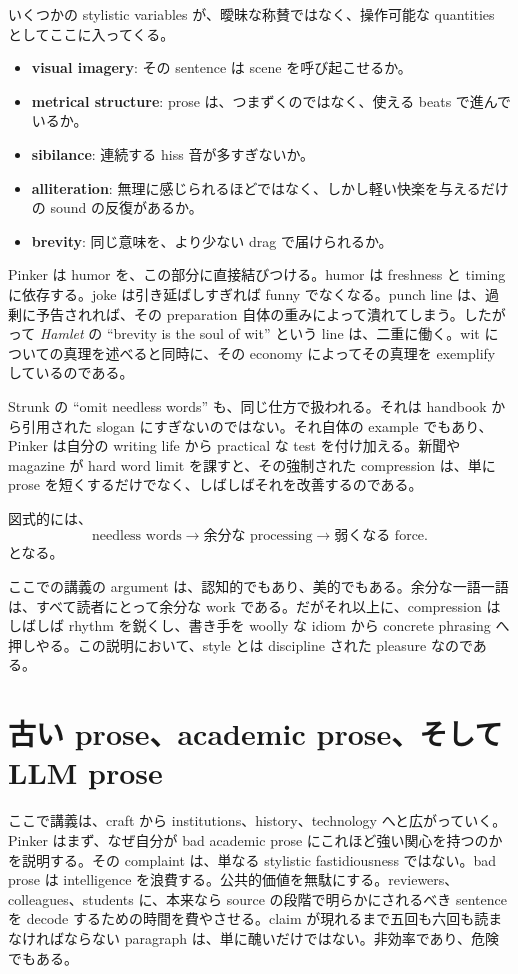 いくつかの stylistic variables が、曖昧な称賛ではなく、操作可能な quantities としてここに入ってくる。
\begin{itemize}
\item \textbf{visual imagery}: その sentence は scene を呼び起こせるか。
\item \textbf{metrical structure}: prose は、つまずくのではなく、使える beats で進んでいるか。
\item \textbf{sibilance}: 連続する hiss 音が多すぎないか。
\item \textbf{alliteration}: 無理に感じられるほどではなく、しかし軽い快楽を与えるだけの sound の反復があるか。
\item \textbf{brevity}: 同じ意味を、より少ない drag で届けられるか。
\end{itemize}

Pinker は humor を、この部分に直接結びつける。humor は freshness と timing に依存する。joke は引き延ばしすぎれば funny でなくなる。punch line は、過剰に予告されれば、その preparation 自体の重みによって潰れてしまう。したがって \emph{Hamlet} の ``brevity is the soul of wit'' という line は、二重に働く。wit についての真理を述べると同時に、その economy によってその真理を exemplify しているのである。

Strunk の ``omit needless words'' も、同じ仕方で扱われる。それは handbook から引用された slogan にすぎないのではない。それ自体の example でもあり、Pinker は自分の writing life から practical な test を付け加える。新聞や magazine が hard word limit を課すと、その強制された compression は、単に prose を短くするだけでなく、しばしばそれを改善するのである。

図式的には、
\begin{equation}
\text{needless words} \to \text{余分な processing} \to \text{弱くなる force}.
\end{equation}
となる。

ここでの講義の argument は、認知的でもあり、美的でもある。余分な一語一語は、すべて読者にとって余分な work である。だがそれ以上に、compression はしばしば rhythm を鋭くし、書き手を woolly な idiom から concrete phrasing へ押しやる。この説明において、style とは discipline された pleasure なのである。

\section{古い prose、academic prose、そして LLM prose}

ここで講義は、craft から institutions、history、technology へと広がっていく。Pinker はまず、なぜ自分が bad academic prose にこれほど強い関心を持つのかを説明する。その complaint は、単なる stylistic fastidiousness ではない。bad prose は intelligence を浪費する。公共的価値を無駄にする。reviewers、colleagues、students に、本来なら source の段階で明らかにされるべき sentence を decode するための時間を費やさせる。claim が現れるまで五回も六回も読まなければならない paragraph は、単に醜いだけではない。非効率であり、危険でもある。

